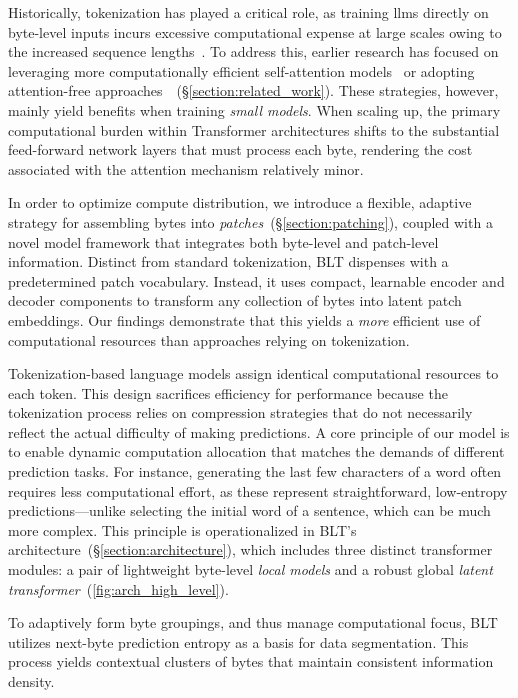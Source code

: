 Historically, tokenization has played a critical role, as training llms directly on byte-level inputs incurs excessive computational expense at large scales owing to the increased sequence lengths~\citep{xue2022byt5}. To address this, earlier research has focused on leveraging more computationally efficient self-attention models~\citep{el2020characterbert, clark2022canine} or adopting attention-free approaches~\citep{wang2024mambabyte}~(\S\ref{section:related_work}). These strategies, however, mainly yield benefits when training \textit{small models}. When scaling up, the primary computational burden within Transformer architectures shifts to the substantial feed-forward network layers that must process each byte, rendering the cost associated with the attention mechanism relatively minor.

In order to optimize compute distribution, we introduce a flexible, adaptive strategy for assembling bytes into \textit{patches}~(\S\ref{section:patching}), coupled with a novel model framework that integrates both byte-level and patch-level information. Distinct from standard tokenization, {\textsc BLT} dispenses with a predetermined patch vocabulary. Instead, it uses compact, learnable encoder and decoder components to transform any collection of bytes into latent patch embeddings. Our findings demonstrate that this yields a \textit{more} efficient use of computational resources than approaches relying on tokenization.

Tokenization-based language models assign identical computational resources to each token. This design sacrifices efficiency for performance because the tokenization process relies on compression strategies that do not necessarily reflect the actual difficulty of making predictions. A core principle of our model is to enable dynamic computation allocation that matches the demands of different prediction tasks. For instance, generating the last few characters of a word often requires less computational effort, as these represent straightforward, low-entropy predictions—unlike selecting the initial word of a sentence, which can be much more complex. This principle is operationalized in {\textsc BLT}'s architecture~(\S\ref{section:architecture}), which includes three distinct transformer modules: a pair of lightweight byte-level \textit{local models} and a robust global \textit{latent transformer}~(\autoref{fig:arch_high_level}). 

To adaptively form byte groupings, and thus manage computational focus, {\textsc BLT} utilizes next-byte prediction entropy as a basis for data segmentation. This process yields contextual clusters of bytes that maintain consistent information density.

